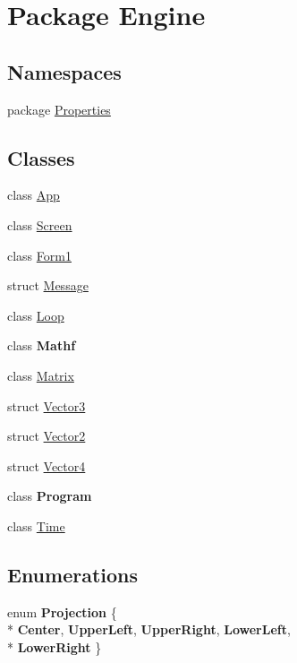\hypertarget{namespace_engine}{\section{Package Engine}
\label{namespace_engine}
}
\subsection*{Namespaces}
\begin{DoxyCompactItemize}
\item 
package \hyperlink{namespace_engine_1_1_properties}{Properties}
\end{DoxyCompactItemize}
\subsection*{Classes}
\begin{DoxyCompactItemize}
\item 
class \hyperlink{class_engine_1_1_app}{App}
\item 
class \hyperlink{class_engine_1_1_screen}{Screen}
\item 
class \hyperlink{class_engine_1_1_form1}{Form1}
\item 
struct \hyperlink{struct_engine_1_1_message}{Message}
\item 
class \hyperlink{class_engine_1_1_loop}{Loop}
\item 
class {\bfseries Mathf}
\item 
class \hyperlink{class_engine_1_1_matrix}{Matrix}
\item 
struct \hyperlink{struct_engine_1_1_vector3}{Vector3}
\item 
struct \hyperlink{struct_engine_1_1_vector2}{Vector2}
\item 
struct \hyperlink{struct_engine_1_1_vector4}{Vector4}
\item 
class {\bfseries Program}
\item 
class \hyperlink{class_engine_1_1_time}{Time}
\end{DoxyCompactItemize}
\subsection*{Enumerations}
\begin{DoxyCompactItemize}
\item 
enum {\bfseries Projection} \{ \\*
{\bfseries Center}, 
{\bfseries Upper\-Left}, 
{\bfseries Upper\-Right}, 
{\bfseries Lower\-Left}, 
\\*
{\bfseries Lower\-Right}
 \}
\end{DoxyCompactItemize}
